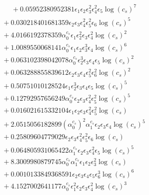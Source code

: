 \documentclass[10pt]{article}
\begin{document}
\begin{align*}
\phantom{F_{s,7}} &\phantom{={}}{}  + 0.05952380952381 \epsilon_{1} \epsilon_{2} \epsilon_{3}^{2} \epsilon_{4}^{2} \epsilon_{5} \log{\left(c_{s} \right)}^{7} \\
&{}  + 0.030218401681359 \epsilon_{2} \epsilon_{3} \epsilon_{4}^{2} \epsilon_{5}^{2} \epsilon_{6} \log{\left(c_{s} \right)}^{5} \\
&{}  + 4.0166192378359 \alpha_{0}^{c_s} \epsilon_{1} \epsilon_{2}^{2} \epsilon_{3} \epsilon_{4}^{2} \log{\left(c_{s} \right)}^{2} \\
&{}  + 1.0089550068141 \alpha_{0}^{c_s} \epsilon_{1} \epsilon_{2} \epsilon_{3}^{3} \epsilon_{4} \log{\left(c_{s} \right)}^{6} \\
&{}  + 0.063102398042078 \alpha_{0}^{c_s} \epsilon_{2}^{3} \epsilon_{3} \epsilon_{4} \epsilon_{5} \log{\left(c_{s} \right)}^{2} \\
&{}  + 0.063288855839612 \epsilon_{2} \epsilon_{3} \epsilon_{4} \epsilon_{5}^{2} \epsilon_{6}^{2} \log{\left(c_{s} \right)}^{2} \\
&{}  + 0.50751010128524 \epsilon_{1} \epsilon_{2}^{3} \epsilon_{3} \epsilon_{4} \epsilon_{5} \log{\left(c_{s} \right)}^{5} \\
&{}  + 0.12792957656249 \alpha_{0}^{c_s} \epsilon_{2} \epsilon_{3} \epsilon_{4}^{2} \epsilon_{5}^{2} \log{\left(c_{s} \right)}^{5} \\
&{}  + 0.016021615332104 \epsilon_{1} \epsilon_{2} \epsilon_{3} \epsilon_{4}^{2} \epsilon_{5}^{2} \log{\left(c_{s} \right)} \\
&{}  + 2.0515056182899 \left(\alpha_{0}^{c_s}\right)^{2} \alpha_{1}^{c_s} \epsilon_{2} \epsilon_{3} \epsilon_{4} \log{\left(c_{s} \right)}^{5} \\
&{}  + 0.25809604779029 \epsilon_{2} \epsilon_{3} \epsilon_{4}^{2} \epsilon_{5}^{2} \epsilon_{6} \log{\left(c_{s} \right)} \\
&{}  + 0.064805931065422 \alpha_{1}^{c_s} \epsilon_{2} \epsilon_{3} \epsilon_{4}^{2} \epsilon_{5} \log{\left(c_{s} \right)}^{5} \\
&{}  + 8.3009980879745 \alpha_{0}^{c_s} \alpha_{1}^{c_s} \epsilon_{1} \epsilon_{2} \epsilon_{3}^{2} \log{\left(c_{s} \right)} \\
&{}  + 0.0010133849368591 \epsilon_{2} \epsilon_{3} \epsilon_{4} \epsilon_{5} \epsilon_{6}^{3} \log{\left(c_{s} \right)}^{6} \\
&{}  + 4.1527002641177 \alpha_{0}^{c_s} \epsilon_{1}^{2} \epsilon_{2} \epsilon_{3} \epsilon_{4}^{2} \log{\left(c_{s} \right)}^{3} \\

\end{align*}
\end{document}
